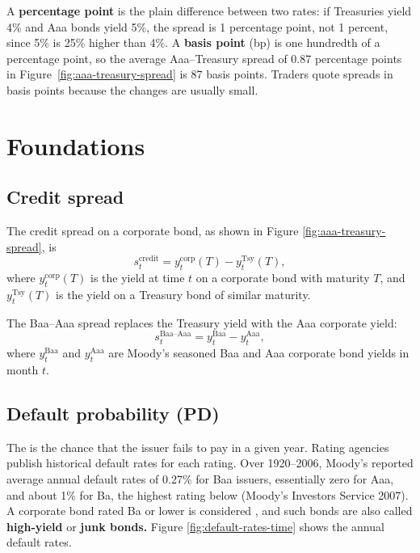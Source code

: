 \begin{callout}{}

A \textbf{percentage point} is the plain difference between two rates: if Treasuries yield 4\% and Aaa bonds yield 5\%, the spread is 1 percentage point, not 1 percent, since 5\% is 25\% higher than 4\%. A \textbf{basis point} (bp) is one hundredth of a percentage point, so the average Aaa--Treasury spread of 0.87 percentage points in Figure~\ref{fig:aaa-treasury-spread} is 87 basis points. Traders quote spreads in basis points because the changes are usually small.
\end{callout}

\section{Foundations}
\label{sec:15-foundations}

\subsection{Credit spread}

The credit spread on a corporate bond, as shown in Figure \ref{fig:aaa-treasury-spread}, is
\begin{equation}
  s_t^{\text{credit}} = y_t^{\text{corp}}(T) - y_t^{\text{Tsy}}(T),
  \label{eq:credit-spread}
\end{equation}
where $y_t^{\text{corp}}(T)$ is the yield at time $t$ on a corporate bond with maturity $T$, and $y_t^{\text{Tsy}}(T)$ is the yield on a Treasury bond of similar maturity.

The Baa--Aaa spread replaces the Treasury yield with the Aaa corporate yield:
\begin{equation}
  s_t^{\text{Baa--Aaa}} = y_t^{\text{Baa}} - y_t^{\text{Aaa}},
  \label{eq:baa-aaa-spread}
\end{equation}
where $y_t^{\text{Baa}}$ and $y_t^{\text{Aaa}}$ are Moody's seasoned Baa and Aaa corporate bond yields in month $t$.


\subsection{Default probability (PD)}

The  is the chance that the issuer fails to pay in a given year. Rating agencies publish historical default rates for each rating. Over 1920--2006, Moody's reported average annual default rates of 0.27\% 
for Baa issuers, essentially zero for Aaa, and about 1\% for Ba, 
the highest rating below  (Moody's Investors Service 2007). A corporate bond rated Ba or lower is considered , and such bonds are also called \textbf{high-yield} or \textbf{junk bonds.} Figure \ref{fig:default-rates-time} shows the annual default rates.

